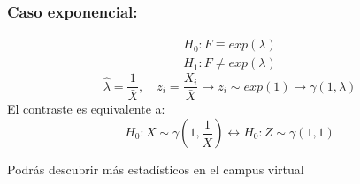 \subsubsection*{Caso exponencial:}

\[
\begin{matrix}
    H_0:F \equiv exp(\lambda) \\
    H_1:F \neq exp(\lambda)
\end{matrix}
\]
\[
    \widehat{\lambda}=\frac{1}{\bar{X}}, \quad z_i
    =\frac{X_i}{\bar{X}} \to z_i \sim exp(1) \longrightarrow\gamma(1,\lambda)
\]
El contraste es equivalente a:
\[
    H_0: X \sim \gamma\left(1,\frac{1}{\bar{X}}\right) \longleftrightarrow H_0:Z \sim \gamma(1,1)
\]

Podrás descubrir más estadísticos en el campus virtual
